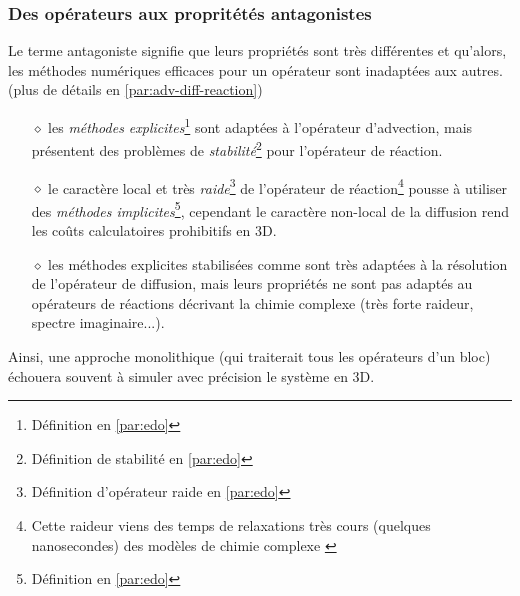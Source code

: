     \subsubsection{Des opérateurs aux propritétés antagonistes}
        Le terme antagoniste signifie que leurs propriétés sont très différentes et qu'alors, les méthodes numériques efficaces pour un opérateur sont inadaptées aux autres.
        (plus de détails en \ref{par:adv-diff-reaction})
        \begin{itemize}
            \item[$\diamond$] les \textit{méthodes explicites}\footnote{Définition en \ref{par:edo}} sont adaptées à l'opérateur d'advection, 
            mais présentent des problèmes de \textit{stabilité}\footnote{Définition de stabilité en \ref{par:edo}} pour l'opérateur de réaction.
            \item[$\diamond$] le caractère local et très \textit{raide}\footnote{Définition d'opérateur raide en \ref{par:edo}} de l'opérateur de réaction\footnote{
                Cette raideur viens des temps de relaxations très cours (quelques nanosecondes) des modèles de chimie complexe \cite{Wartha2021}}
            pousse à utiliser des \textit{méthodes implicites}\footnote{Définition en \ref{par:edo}}, cependant le caractère non-local 
            de la diffusion rend les coûts calculatoires prohibitifs en 3D.
            \item[$\diamond$] les méthodes explicites stabilisées comme \cite{AbdulleMedovikov2001} sont très adaptées à la résolution de l'opérateur de diffusion, mais 
            leurs propriétés ne sont pas adaptés au opérateurs de réactions décrivant la chimie complexe (très forte raideur, spectre imaginaire...).
        \end{itemize}
        Ainsi, une approche monolithique (qui traiterait tous les opérateurs d'un bloc) échouera souvent à simuler avec précision le système en 3D.
